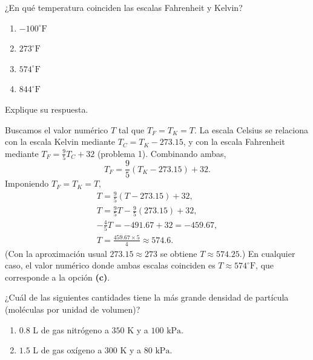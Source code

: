 \documentclass[12pt,a4paper]{article}
\newcommand{\paren}[1]{\left( #1 \right)}
\begin{document}
    \begin{problema}
        ¿En qué temperatura coinciden las escalas Fahrenheit y Kelvin?
        \begin{enumerate}
            \item[(a)] $-100^{\circ}\text{F}$
            \item[(b)] $273^{\circ}\text{F}$
            \item[(c)] $574^{\circ}\text{F}$
            \item[(d)] $844^{\circ}\text{F}$
        \end{enumerate}
        Explique su respuesta.
    \end{problema}

    \begin{solucion}
        Buscamos el valor numérico $T$ tal que $T_{F}=T_{K}=T$. La escala Celsius se relaciona
        con la escala Kelvin mediante $T_{C}=T_{K}-273.15$, y con la escala Fahrenheit mediante
        $T_{F}=\frac{9}{5}T_{C}+32$ (problema 1). Combinando ambas,
        \begin{equation*}
            T_{F}=\frac{9}{5}\paren{T_{K}-273.15}+32.
        \end{equation*}
        Imponiendo $T_{F}=T_{K}=T$,
        \begin{gather*}
            T=\frac{9}{5}\paren{T-273.15}+32,\\
            T=\frac{9}{5}T-\frac{9}{5}(273.15)+32,\\
            -\frac{4}{5}T=-491.67+32=-459.67,\\
            T=\frac{459.67\times5}{4}\approx574.6.
        \end{gather*}
        (Con la aproximación usual $273.15\approx273$ se obtiene $T\approx574.25$.) En cualquier
        caso, el valor numérico donde ambas escalas coinciden es $T\approx574^{\circ}\text{F}$,
        que corresponde a la opción \textbf{(c)}.
    \end{solucion}

    \begin{problema}
        ¿Cuál de las siguientes cantidades tiene la más grande densidad de partícula (moléculas
        por unidad de volumen)?
        \begin{enumerate}
            \item[(A)] $0.8$ L de gas nitrógeno a $350\text{ K}$ y a $100\text{ kPa}$.
            \item[(C)] $1.5$ L de gas oxígeno a $300\text{ K}$ y a $80\text{ kPa}$.
        \end{enumerate}
    \end{problema}
\end{document}
